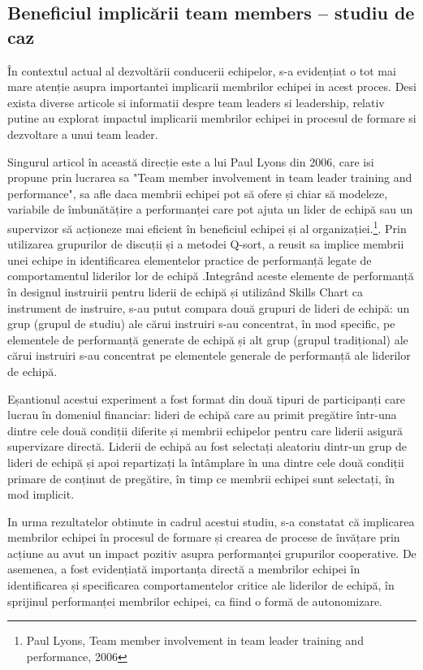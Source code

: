\documentclass[a4paper, 12pt]{article}
\begin{document}
\begin{itemize}
	\subsection {Beneficiul implicării team members – studiu de caz }
	
	
	\quad\quad  În contextul actual al dezvoltării conducerii echipelor, s-a evidențiat o tot mai mare atenție asupra importantei implicarii membrilor echipei in acest proces. Desi exista diverse articole si informatii despre team leaders si leadership, relativ putine au explorat impactul implicarii membrilor echipei in procesul de formare si dezvoltare a unui team leader. 

	\quad Singurul articol în această direcție este a lui Paul Lyons din 2006, care isi propune prin lucrarea sa "Team member involvement in team leader training and performance", sa afle daca membrii echipei pot să ofere și chiar să modeleze, variabile de îmbunătățire a performanței care pot ajuta un lider de echipă sau un supervizor să acționeze mai eficient în beneficiul echipei și al organizației.\footnote{Paul Lyons, Team member involvement in team leader training and performance, 2006}.  Prin utilizarea grupurilor de discuții și a metodei Q-sort, a reusit sa implice membrii unei echipe in identificarea elementelor practice de performanță legate de comportamentul liderilor lor de echipă .Integrând aceste elemente de performanță în designul instruirii pentru liderii de echipă și utilizând Skills Chart ca instrument de instruire, s-au putut compara două grupuri de lideri de echipă: un grup (grupul de studiu) ale cărui instruiri s-au concentrat, în mod specific, pe elementele de performanță generate de echipă și alt grup (grupul tradițional) ale cărui instruiri s-au concentrat pe elementele generale de performanță ale liderilor de echipă. 

	\quad Eșantionul acestui experiment a fost format din două tipuri de participanți care lucrau în domeniul financiar: lideri de echipă care au primit pregătire într-una dintre cele două condiții diferite și membrii echipelor pentru care liderii asigură supervizare directă. Liderii de echipă au fost selectați aleatoriu dintr-un grup de lideri de echipă și apoi repartizați la întâmplare în una dintre cele două condiții primare de conținut de pregătire, în timp ce membrii echipei sunt selectați, în mod implicit. 

	\quad In urma rezultatelor obtinute in cadrul acestui studiu, s-a constatat că implicarea membrilor echipei în procesul de formare și crearea de procese de învățare prin acțiune au avut un impact pozitiv asupra performanței grupurilor cooperative. De asemenea, a fost evidențiată importanța directă a membrilor echipei în identificarea și specificarea comportamentelor critice ale liderilor de echipă, în sprijinul performanței membrilor echipei, ca fiind o formă de autonomizare. 


\end{itemize}
\end{document}
